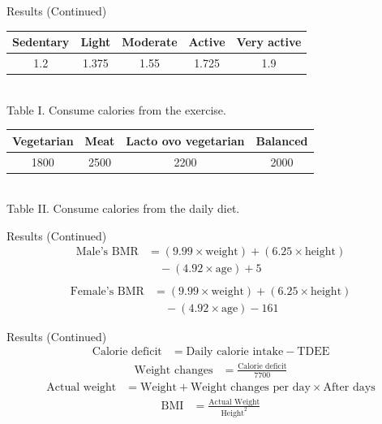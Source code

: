 \documentclass[fleqn]{beamer}
\begin{document}
\begin{frame}{Results (Continued)}
\vspace{2em}
\sloppy
\renewcommand{\arraystretch}{1.35}
\centering
\begin{tabular}{|c|c|c|c|c|}
\hline
Sedentary & Light & Moderate & Active & Very active \\
\hline
1.2 & 1.375 & 1.55 & 1.725 & 1.9 \\
\hline
\end{tabular}
\vspace{1em} \\
Table I. Consume calories from the exercise. 
\vspace{1em} \\
\begin{tabular}{|c|c|c|c|}
\hline
Vegetarian & Meat & Lacto ovo vegetarian & Balanced \\
\hline
1800 & 2500 & 2200 & 2000 \\
\hline
\end{tabular}
\vspace{1em} \\
Table II. Consume calories from the daily diet. 
\vspace{1em} \\
\end{frame}
\begin{frame}{Results (Continued)}
\sloppy
\begin{align*}
\text{Male's BMR} &= (9.99 \times \text{weight}) + (6.25 \times \text{height}) \\
&\quad - (4.92 \times \text{age}) + 5 \\
\end{align*}
\begin{align*}
\text{Female's BMR} &= (9.99 \times \text{weight}) + (6.25 \times \text{height}) \\
&\quad - (4.92 \times \text{age}) - 161
\end{align*}
\end{frame}
\begin{frame}{Results (Continued)}
\sloppy
\begin{align*}
\text{Calorie deficit} &= \text{Daily calorie intake} - \text{TDEE}
\end{align*}
\begin{align*}
\text{Weight changes} &= \frac{\text{Calorie deficit}}{7700} 
\end{align*}
\begin{align*}
\text{Actual weight} &= \text{Weight} + \text{Weight changes per day} \times \text{After days}
\end{align*}
\begin{align*}
\text{BMI} &= \frac{\text{Actual Weight}}{\text{Height}^2}
\end{align*}
\end{frame}
\end{document}
